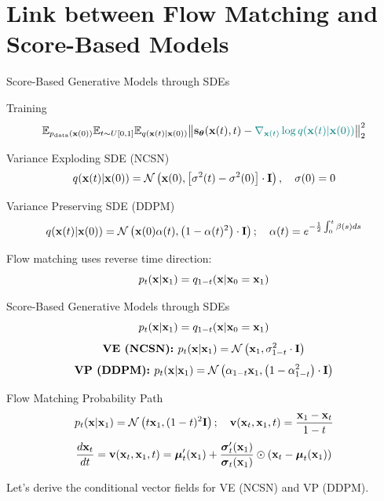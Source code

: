 \documentclass{beamer}
\renewcommand{\eqpause}{}
\begin{document}
\section{Link between Flow Matching and Score-Based Models}
\begin{frame}{Score-Based Generative Models through SDEs}
	\vspace{-0.3cm}
	\begin{block}{Training}
		\vspace{-0.7cm}
		\[
			\mathbb{E}_{p_{\text{data}}(\mathbf{x}(0))} \mathbb{E}_{t \sim U[0, 1]} \mathbb{E}_{q(\mathbf{x}(t) | \mathbf{x}(0))}\bigl\| \mathbf{s}_{\boldsymbol{\theta}}(\mathbf{x}(t), t) - {\color{teal}\nabla_{\mathbf{x}(t)} \log q(\mathbf{x}(t) | \mathbf{x}(0))} \bigr\|^2_2 
		\]
		\vspace{-0.5cm}
	\end{block}
	\eqpause
	\begin{block}{Variance Exploding SDE (NCSN)}
		\vspace{-0.3cm}
		\[
			q(\mathbf{x}(t) | \mathbf{x}(0)) = \mathcal{N}\left(\mathbf{x}(0), \left[\sigma^2(t) - \sigma^2(0)\right] \cdot \mathbf{I}\right), \quad \sigma(0) =0
		\]
		\vspace{-0.5cm}
	\end{block}
	\begin{block}{Variance Preserving SDE (DDPM)}
		\vspace{-0.5cm}
		\[
			q(\mathbf{x}(t) | \mathbf{x}(0)) = \mathcal{N}\left(\mathbf{x}(0) \alpha(t), \left(1 - \alpha(t)^2\right) \cdot \mathbf{I}\right); \quad \alpha(t) = e^{-\frac{1}{2} \int_0^t \beta(s) ds}
		\]
		\vspace{-0.5cm}
	\end{block}
	\eqpause
	Flow matching uses reverse time direction:
	\[
		p_t(\mathbf{x}| \mathbf{x}_1) = q_{1-t}(\mathbf{x}| \mathbf{x}_0=\mathbf{x}_1)
	\]
\end{frame}
\begin{frame}{Score-Based Generative Models through SDEs}
	\[
		p_t(\mathbf{x}| \mathbf{x}_1) = q_{1-t}(\mathbf{x}| \mathbf{x}_0=\mathbf{x}_1)
	\]
	\[
		\textbf{VE (NCSN): } p_t(\mathbf{x} | \mathbf{x}_1) = \mathcal{N}\left(\mathbf{x}_1, \sigma^2_{1-t} \cdot \mathbf{I}\right)
	\]
	\vspace{-0.5cm}
	\[
		\textbf{VP (DDPM): } p_t(\mathbf{x} | \mathbf{x}_1) = \mathcal{N}\left(\alpha_{1-t} \mathbf{x}_1, \left(1 - \alpha_{1-t}^2\right) \cdot \mathbf{I}\right)
	\]
	\vspace{-0.5cm}
	\eqpause
	\begin{block}{Flow Matching Probability Path}
		\vspace{-0.3cm}
		\[
			p_t(\mathbf{x} | \mathbf{x}_1) = \mathcal{N}\left(t \mathbf{x}_1, (1-t)^2 \mathbf{I}\right); \quad \mathbf{v}(\mathbf{x}_t, \mathbf{x}_1, t) = \frac{\mathbf{x}_1  - \mathbf{x}_t}{1-t}
		\]
		\vspace{-0.3cm}
		\[
	 		\frac{d\mathbf{x}_t}{dt} = \mathbf{v}(\mathbf{x}_t, \mathbf{x}_1, t) =  \boldsymbol{\mu}_t'(\mathbf{x}_1) + \frac{\boldsymbol{\sigma}_t'(\mathbf{x}_1)}{\boldsymbol{\sigma}_t(\mathbf{x}_1)} \odot (\mathbf{x}_t - \boldsymbol{\mu}_t(\mathbf{x}_1))
		\]
	\end{block}
	\eqpause
	Let's derive the conditional vector fields for VE (NCSN) and VP (DDPM).
\end{frame}
\end{document}

